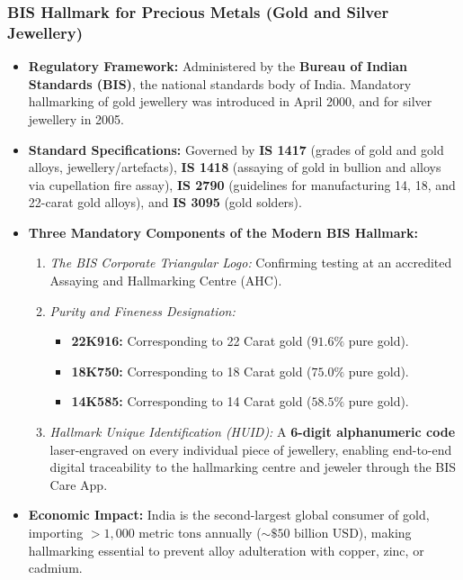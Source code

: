 \documentclass[11pt,a4paper,oneside]{article}
\begin{document}
\subsubsection{BIS Hallmark for Precious Metals (Gold and Silver Jewellery)}
\begin{itemize}[leftmargin=*]
    \item \textbf{Regulatory Framework:} Administered by the \textbf{Bureau of Indian Standards (BIS)}, the national standards body of India. Mandatory hallmarking of gold jewellery was introduced in April 2000, and for silver jewellery in 2005.
    \item \textbf{Standard Specifications:} Governed by \textbf{IS 1417} (grades of gold and gold alloys, jewellery/artefacts), \textbf{IS 1418} (assaying of gold in bullion and alloys via cupellation fire assay), \textbf{IS 2790} (guidelines for manufacturing 14, 18, and 22-carat gold alloys), and \textbf{IS 3095} (gold solders).
    \item \textbf{Three Mandatory Components of the Modern BIS Hallmark:}
    \begin{enumerate}[leftmargin=*]
        \item \textit{The BIS Corporate Triangular Logo:} Confirming testing at an accredited Assaying and Hallmarking Centre (AHC).
        \item \textit{Purity and Fineness Designation:}
        \begin{itemize}
            \item \textbf{22K916:} Corresponding to 22 Carat gold ($91.6\%$ pure gold).
            \item \textbf{18K750:} Corresponding to 18 Carat gold ($75.0\%$ pure gold).
            \item \textbf{14K585:} Corresponding to 14 Carat gold ($58.5\%$ pure gold).
        \end{itemize}
        \item \textit{Hallmark Unique Identification (HUID):} A \textbf{6-digit alphanumeric code} laser-engraved on every individual piece of jewellery, enabling end-to-end digital traceability to the hallmarking centre and jeweler through the BIS Care App.
    \end{enumerate}
    \item \textbf{Economic Impact:} India is the second-largest global consumer of gold, importing $>1{,}000\text{ metric tons}$ annually ($\sim \$50\text{ billion USD}$), making hallmarking essential to prevent alloy adulteration with copper, zinc, or cadmium.
\end{itemize}
\end{document}
